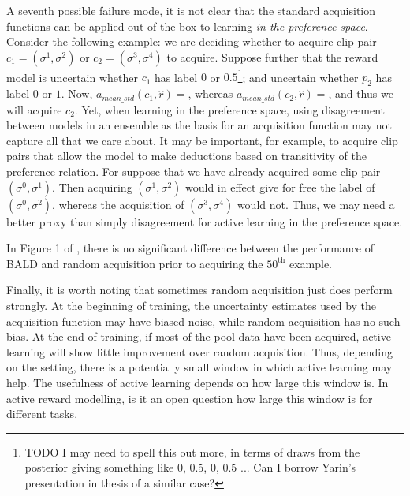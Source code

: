\documentclass[11pt, a4paper, bibliography=totoc]{report}
\newcommand{\rp}{\hat{r}}
\begin{document}
A seventh possible failure mode, it is not clear that the standard acquisition functions can be applied out of the box to learning \textit{in the preference space}. Consider the following example: we are deciding whether to acquire clip pair $ c_1 = (\sigma^1, \sigma^2) $ or $ c_2 = (\sigma^3, \sigma^4) $ to acquire. Suppose further that the reward model is uncertain whether $ c_1 $ has label $ 0 $ or $ 0.5 $\footnote{TODO I may need to spell this out more, in terms of draws from the posterior giving something like 0, 0.5, 0, 0.5 ... Can I borrow Yarin's presentation in thesis of a similar case?}; and uncertain whether $ p_2 $ has label $ 0 $ or $ 1 $. Now, $ a_{mean\_std}(c_1, \rp) =  $, whereas $ a_{mean\_std}(c_2, \rp) =  $, and thus we will acquire $ c_2 $. Yet, when learning in the preference space, using disagreement between models in an ensemble as the basis for an acquisition function may not capture all that we care about. It may be important, for example, to acquire clip pairs that allow the model to make deductions based on transitivity of the preference relation. For suppose that we have already acquired some clip pair $ (\sigma^0, \sigma^1) $. Then acquiring $ (\sigma^1, \sigma^2) $ would in effect give for free the label of $ (\sigma^0, \sigma^2) $, whereas the acquisition of $ (\sigma^3, \sigma^4) $ would not. Thus, we may need a better proxy than simply disagreement for active learning in the preference space.

In Figure 1 of \cite{Gal2017b}, there is no significant difference between the performance of BALD and random acquisition prior to acquiring the $ 50^\text{th} $ example.

Finally, it is worth noting that sometimes random acquisition just does perform strongly. At the beginning of training, the uncertainty estimates used by the acquisition function may have biased noise, while random acquisition has no such bias. At the end of training, if most of the pool data have been acquired, active learning will show little improvement over random acquisition. Thus, depending on the setting, there is a potentially small window in which active learning may help. The usefulness of active learning depends on how large this window is. In active reward modelling, is it an open question how large this window is for different tasks.
\end{document}
